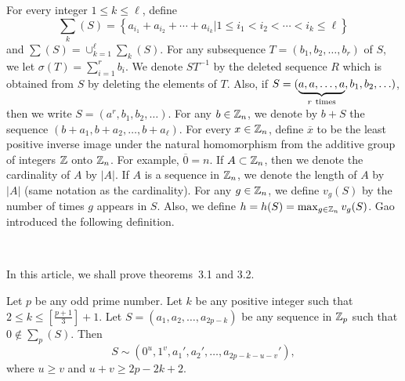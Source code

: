 \documentclass[fleqn]{mat01}
\begin{document}
For every integer $1\leq k\leq \ell$, define
\begin{equation*}
\sum_{k}(S)=\left\{a_{i_1}+a_{i_2}+\cdots+a_{i_k} | 1\leq i_1 < i_2 <
\cdots < i_k \leq \ell\right\}
\end{equation*}
and $\sum(S) = \cup_{k=1}^\ell \sum_k(S)$. For any subsequence $T =
(b_1, b_2,\ldots,b_r)$ of $S$, we let $\sigma(T) = \sum_{i=1}^rb_i$. We
denote $ST^{-1}$ by the deleted sequence $R$ which is obtained from $S$
by deleting the elements of $T$. Also, if $S =
({\underbrace{a,a,\ldots,a}_{r \ {\rm times}}}, b_1,b_2,\ldots)$,
then we write $S = (a^r,b_1,b_2,\ldots)$. For any $b\in {\Bbb Z}_n$, we
denote by $b+S$ the sequence $(b+a_1,b+a_2,\ldots, b+a_\ell)$. For every
$x \in {\Bbb Z}_n$, define $\overline{x}$ to be the least positive
inverse image under the natural homomorphism from the additive group of
integers ${\Bbb Z}$ onto ${\Bbb Z}_n$. For example, $\overline{0} = n$.
If $A\subset {\Bbb Z}_n$, then we denote the cardinality of $A$ by
$|A|$. If $A$ is a sequence in ${\Bbb Z}_n$, we denote the length of $A$
by $|A|$ (same notation as the cardinality). For any $g\in{\Bbb Z}_n$,
we define $v_g(S)$ by the number of times $g$ appears in $S$. Also, we
define $h = h(S) = \max_{g\in{\Bbb Z}_n}v_g(S)$. Gao \cite{gao10}
introduced the following definition.

\pagebreak

\begin{definit}$\left.\right.$\vspace{.5pc}

\end{definit}

In this article, we shall prove theorems~3.1 and 3.2.

\setcounter{section}{3}
\setcounter{theore}{0}
\begin{theor}[\!] Let $p$ be any odd prime number. Let $k$ be any
positive integer such that $2\leq k\leq \left[\frac{p+1}3\right]+1$. Let
$S = (a_1,a_2,\ldots,a_{2p-k})$ be any sequence in ${\Bbb Z}_p$ such
that $0\not\in \sum_p(S)$. Then
\begin{equation*}
S \sim (0^u, 1^v, a_1',a_2',\ldots,a_{2p-k-u-v}'),
\end{equation*}
where $u\geq v$ and $u+v\geq 2p-2k+2$.
\end{theor}
\end{document}
